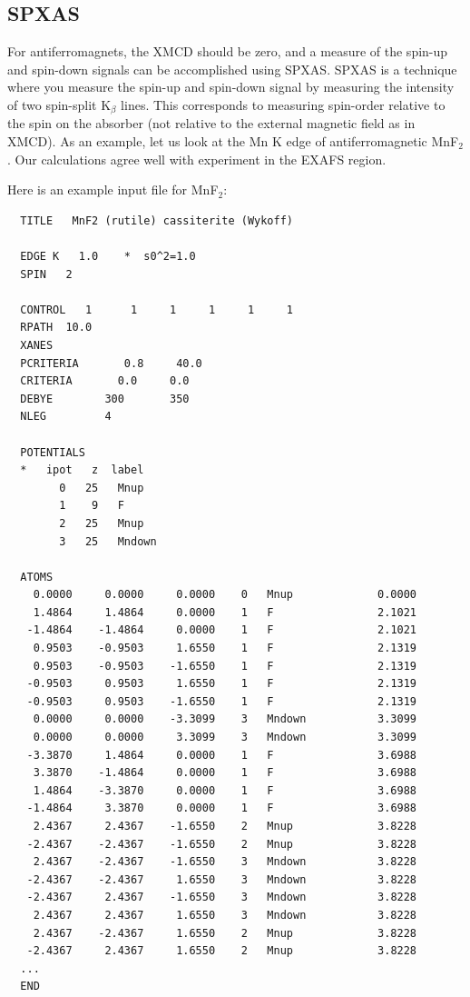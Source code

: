\documentclass[11pt,oneside]{report} %
\begin{document}
\subsection{SPXAS}
\label{sec:SPXAS}
For antiferromagnets, the XMCD should be zero, and a measure of the 
spin-up and spin-down signals can be accomplished using SPXAS. SPXAS 
is a technique where you measure the spin-up and spin-down signal by 
measuring the intensity of two spin-split K$_{\beta}$ lines. This 
corresponds to measuring spin-order relative to the spin on the absorber 
(not relative to the external magnetic field as in XMCD). As an example, 
let us look at the Mn K edge of antiferromagnetic MnF$_2$. Our calculations 
agree well with experiment in the EXAFS region.

Here is an example input file for MnF$_2$:

\begin{verbatim}
  TITLE   MnF2 (rutile) cassiterite (Wykoff)
  
  EDGE K   1.0    *  s0^2=1.0
  SPIN   2
 
  CONTROL   1      1     1     1     1     1
  RPATH  10.0
  XANES
  PCRITERIA       0.8     40.0
  CRITERIA       0.0     0.0  
  DEBYE        300       350
  NLEG         4

  POTENTIALS
  *   ipot   z  label
        0   25   Mnup
        1    9   F
        2   25   Mnup
        3   25   Mndown
 
  ATOMS
    0.0000     0.0000     0.0000    0   Mnup             0.0000
    1.4864     1.4864     0.0000    1   F                2.1021
   -1.4864    -1.4864     0.0000    1   F                2.1021
    0.9503    -0.9503     1.6550    1   F                2.1319
    0.9503    -0.9503    -1.6550    1   F                2.1319
   -0.9503     0.9503     1.6550    1   F                2.1319
   -0.9503     0.9503    -1.6550    1   F                2.1319
    0.0000     0.0000    -3.3099    3   Mndown           3.3099
    0.0000     0.0000     3.3099    3   Mndown           3.3099
   -3.3870     1.4864     0.0000    1   F                3.6988
    3.3870    -1.4864     0.0000    1   F                3.6988
    1.4864    -3.3870     0.0000    1   F                3.6988
   -1.4864     3.3870     0.0000    1   F                3.6988
    2.4367     2.4367    -1.6550    2   Mnup             3.8228
   -2.4367    -2.4367    -1.6550    2   Mnup             3.8228
    2.4367    -2.4367    -1.6550    3   Mndown           3.8228
   -2.4367    -2.4367     1.6550    3   Mndown           3.8228
   -2.4367     2.4367    -1.6550    3   Mndown           3.8228
    2.4367     2.4367     1.6550    3   Mndown           3.8228
    2.4367    -2.4367     1.6550    2   Mnup             3.8228
   -2.4367     2.4367     1.6550    2   Mnup             3.8228
  ...
  END
\end{verbatim}
\end{document}
